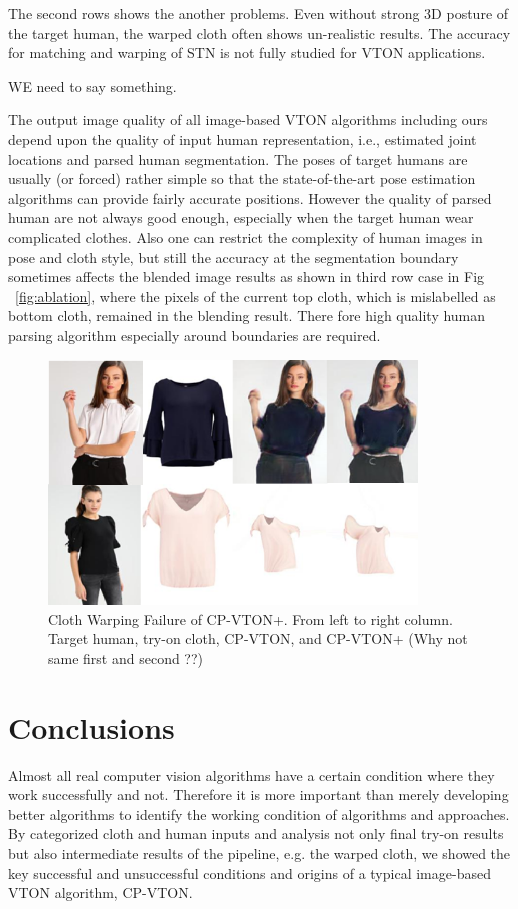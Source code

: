\documentclass[runningheads]{llncs}
\begin{document}
The second rows shows the another problems. Even without strong 3D posture of the target human, the warped cloth often shows un-realistic results. The accuracy for matching and warping of STN is not fully studied for VTON applications. 

WE need to say something.
    

The output image quality of all image-based VTON algorithms including ours depend upon the quality of input human representation, i.e., estimated joint locations and parsed human segmentation. The poses of target humans are usually (or forced) rather simple so that the state-of-the-art pose estimation algorithms can provide fairly accurate positions. However the quality of parsed human are not always good enough, especially when the target human wear complicated clothes. Also one can restrict the complexity of human images in pose and cloth style, but still the accuracy at the segmentation boundary sometimes affects the blended image results as shown in third row case in Fig ~\ref{fig:ablation}, where the pixels of the current top cloth, which is mislabelled as bottom cloth, remained in the blending result. There fore high quality human parsing algorithm especially around boundaries are required.   


\begin{figure}
\centering
\includegraphics[height=6.5cm, scale=1]{figures/gmmfailure.png} 
\caption{Cloth Warping Failure of CP-VTON+. From left to right column. Target human, try-on cloth, CP-VTON, and CP-VTON+  (Why not same first and second ??)
}
\label{fig:gmmfailure}
\end{figure}
 
\section{Conclusions}

Almost all real computer vision algorithms have a certain condition where they work successfully and not. Therefore it is more important than merely developing better algorithms to identify the working condition of algorithms and approaches.  By categorized cloth and human inputs and analysis not only final try-on results but also intermediate results of the pipeline, e.g. the warped cloth, we showed the key successful and unsuccessful conditions and origins of a typical image-based VTON algorithm, CP-VTON. 
\end{document}
